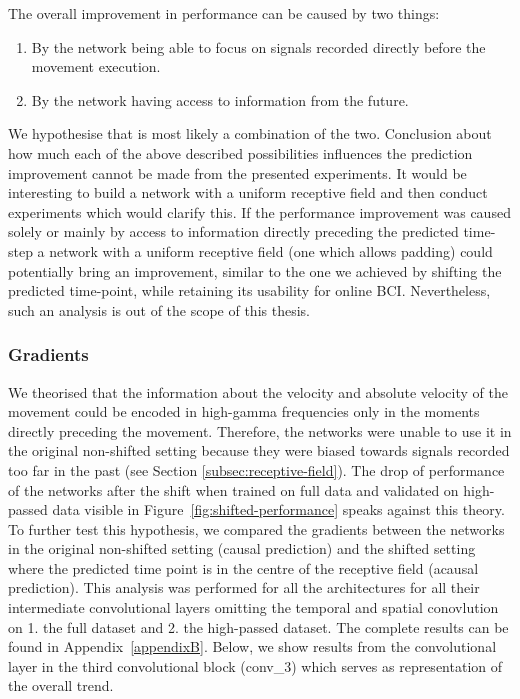 The overall improvement in performance can be caused by two things:
\begin{enumerate}
    \item By the network being able to focus on signals recorded directly before the movement execution.
    \item By the network having access to information from the future.
\end{enumerate}

We hypothesise that is most likely a combination of the two.
Conclusion about how much each of the above described possibilities influences the prediction improvement cannot be made from the presented experiments.
It would be interesting to build a network with a uniform receptive field and then conduct experiments which would clarify this.
If the performance improvement was caused solely or mainly by access to information directly preceding the predicted time-step a network with a uniform receptive field (one which allows padding) could potentially bring an improvement, similar to the one we achieved by shifting the predicted time-point, while retaining its usability for online BCI.
Nevertheless, such an analysis is out of the scope of this thesis.


\subsubsection{Gradients}
We theorised that the information about the velocity and absolute velocity of the movement could be encoded in high-gamma frequencies only in the moments directly preceding the movement.
Therefore, the networks were unable to use it in the original non-shifted setting because they were biased towards signals recorded too far in the past (see Section \ref{subsec:receptive-field}).
The drop of performance of the networks after the shift when trained on full data and validated on high-passed data visible in Figure~\ref{fig:shifted-performance} speaks against this theory. 
To further test this hypothesis, we compared the gradients between the networks in the original non-shifted setting (causal prediction) and the shifted setting where the predicted time point is in the centre of the receptive field (acausal prediction).
This analysis was performed for all the architectures for all their intermediate convolutional layers omitting the temporal and spatial conovlution on 1. the full dataset and 2. the high-passed dataset.
The complete results can be found in Appendix~\ref{appendixB}.
Below, we show results from the convolutional layer in the third convolutional block (conv\_3) which serves as representation of the overall trend. 


